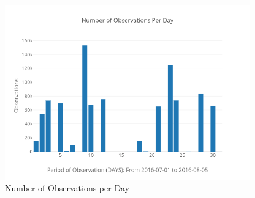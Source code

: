 \documentclass[11pt,fleqn]{book} %
\begin{document}
\begin{figure}[h!]%
\centering%
\includegraphics[width=400px]{Pictures/Morelia Hive 2observationsPerdayUnclean.png}%
\caption{Number of Observations per Day}%
\end{figure}
\end{document}
